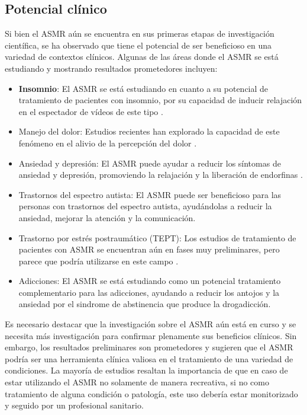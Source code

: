 \documentclass[a4paper,12pt,twoside]{memoir}
\begin{document}
\subsection{Potencial clínico}
Si bien el ASMR aún se encuentra en sus primeras etapas de investigación científica, se ha observado que tiene el potencial de ser beneficioso en una variedad de contextos clínicos. Algunas de las áreas donde el ASMR se está estudiando y mostrando resultados prometedores incluyen:
\begin{itemize}
    \item \textbf{Insomnio}: El ASMR se está estudiando en cuanto a su potencial de tratamiento de pacientes con insomnio, por su capacidad de inducir relajación en el espectador de vídeos de este tipo \cite{smejka-2022}.
    \item Manejo del dolor: Estudios recientes han explorado la capacidad de este fenómeno en el alivio de la percepción del dolor \cite{mcerlean-2022}.
    \item Ansiedad y depresión: El ASMR puede ayudar a reducir los síntomas de ansiedad y depresión, promoviendo la relajación y la liberación de endorfinas \cite{sakurai-2023}.
    \item Trastornos del espectro autista: El ASMR puede ser beneficioso para las personas con trastornos del espectro autista, ayudándolas a reducir la ansiedad, mejorar la atención y la comunicación\cite{galante-2019}.
    \item Trastorno por estrés postraumático (TEPT): Los estudios de tratamiento de pacientes con ASMR se encuentran aún en fases muy preliminares, pero parece que podría utilizarse en este campo \cite{rouw-2017}.
    \item Adicciones: El ASMR se está estudiando como un potencial tratamiento complementario para las adicciones, ayudando a reducir los antojos y la ansiedad por el sindrome de abstinencia que produce la drogadicción\cite{hu-2022}.

\end{itemize}
Es necesario destacar que la investigación sobre el ASMR aún está en curso y se necesita más investigación para confirmar plenamente sus beneficios clínicos. Sin embargo, los resultados preliminares son prometedores y sugieren que el ASMR podría ser una herramienta clínica valiosa en el tratamiento de una variedad de condiciones. La mayoría de estudios resaltan la importancia de que en caso de estar utilizando el ASMR no solamente de manera recreativa, si no como tratamiento de alguna condición o patología, este uso debería estar monitorizado y seguido por un profesional sanitario.
\end{document}
